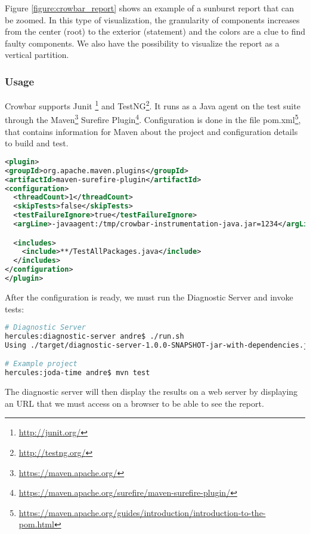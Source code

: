 Figure \ref{figure:crowbar_report} shows an example of a sunburst report that can be zoomed. In this type of visualization, the granularity of components increases from the center (root) to the exterior (statement) and the colors are a clue to find faulty components. We also have the possibility to visualize the report as a vertical partition.

\subsubsection*{Usage}
Crowbar supports Junit \footnote{\url{http://junit.org/}} and TestNG\footnote{\url{http://testng.org/}}. It runs as a Java agent on the test suite through the Maven\footnote{\url{https://maven.apache.org/}} Surefire Plugin\footnote{\url{https://maven.apache.org/surefire/maven-surefire-plugin/}}. Configuration is done in the file pom.xml\footnote{\url{https://maven.apache.org/guides/introduction/introduction-to-the-pom.html}}, that contains information for Maven about the project and configuration details to build and test.

\begin{lstlisting}[language=xml, caption=Excerpt of Crowbar configuration on a Maven project.]
<plugin>
<groupId>org.apache.maven.plugins</groupId>
<artifactId>maven-surefire-plugin</artifactId>
<configuration>
  <threadCount>1</threadCount>
  <skipTests>false</skipTests>
  <testFailureIgnore>true</testFailureIgnore>
  <argLine>-javaagent:/tmp/crowbar-instrumentation-java.jar=1234</argLine>

  <includes>
    <include>**/TestAllPackages.java</include>
  </includes>
</configuration>
</plugin>
\end{lstlisting}

After the configuration is ready, we must run the Diagnostic Server and invoke tests:

\begin{lstlisting}[language=bash, caption=Running Crowbar.]
# Diagnostic Server
hercules:diagnostic-server andre$ ./run.sh 
Using ./target/diagnostic-server-1.0.0-SNAPSHOT-jar-with-dependencies.jar:rest.DiagnosticServer

# Example project
hercules:joda-time andre$ mvn test

\end{lstlisting}

The diagnostic server will then display the results on a web server by displaying an URL that we must access on a browser to be able to see the report.

